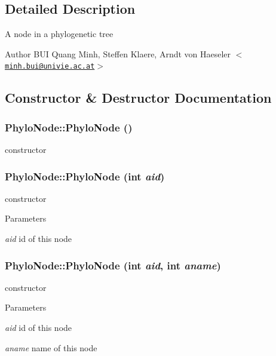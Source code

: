 \subsection{Detailed Description}
A node in a phylogenetic tree

\begin{DoxyAuthor}{Author}
BUI Quang Minh, Steffen Klaere, Arndt von Haeseler $<$\href{mailto:minh.bui@univie.ac.at}{\tt minh.bui@univie.ac.at}$>$ 
\end{DoxyAuthor}


\subsection{Constructor \& Destructor Documentation}
\hypertarget{classPhyloNode_a82abba4349a6808ba134a89fae92fb7f}{
\subsubsection[{PhyloNode}]{\setlength{\rightskip}{0pt plus 5cm}PhyloNode::PhyloNode ()}}
\label{classPhyloNode_a82abba4349a6808ba134a89fae92fb7f}
constructor \hypertarget{classPhyloNode_a07225896ff0a5e57a286f6deedef2421}{
\subsubsection[{PhyloNode}]{\setlength{\rightskip}{0pt plus 5cm}PhyloNode::PhyloNode (int {\em aid})}}
\label{classPhyloNode_a07225896ff0a5e57a286f6deedef2421}
constructor 
\begin{DoxyParams}{Parameters}
\item[{\em aid}]id of this node \end{DoxyParams}
\hypertarget{classPhyloNode_ae89376e4022663801fb2d83e2d55afbe}{
\subsubsection[{PhyloNode}]{\setlength{\rightskip}{0pt plus 5cm}PhyloNode::PhyloNode (int {\em aid}, \/  int {\em aname})}}
\label{classPhyloNode_ae89376e4022663801fb2d83e2d55afbe}
constructor 
\begin{DoxyParams}{Parameters}
\item[{\em aid}]id of this node \item[{\em aname}]name of this node \end{DoxyParams}
